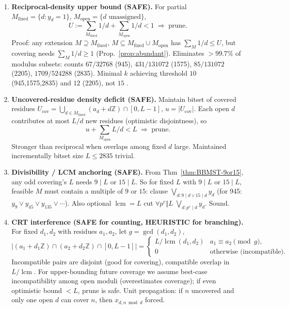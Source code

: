 \documentclass[11pt,a4paper]{article}
\theoremstyle{plain}
\theoremstyle{definition}
\theoremstyle{remark}
\newcommand{\Z}{\mathbb{Z}}
\begin{document}
\begin{enumerate}[label=\textbf{\arabic*.}]
\item \textbf{Reciprocal-density upper bound (SAFE).} For partial $M_{\mathrm{fixed}}=\{d:y_{d}=1\}$, $M_{\mathrm{open}}=\{d\text{ unassigned}\}$,
\[
U:=\sum_{M_{\mathrm{fixed}}}\!1/d+\sum_{M_{\mathrm{open}}}\!1/d<1\;\Rightarrow\;\text{prune}.
\]
Proof: any extension $M\supseteq M_{\mathrm{fixed}}$, $M\subseteq M_{\mathrm{fixed}}\cup M_{\mathrm{open}}$ has $\sum_{M}1/d\le U$, but covering needs $\sum_{M}1/d\ge1$ (Prop.~\ref{prop:abundant}). Eliminates $>99.7\%$ of modulus subsets: counts $67/32768$ (945), $431/131072$ (1575), $85/131072$ (2205), $1709/524288$ (2835). Minimal $k$ achieving threshold $10$ (945,1575,2835) and $12$ (2205), not $15$ .

\item \textbf{Uncovered-residue density deficit (SAFE).} Maintain bitset of covered residues $U_{\mathrm{cov}}=\bigcup_{d\in M_{\mathrm{fixed}}}(a_{d}+d\Z)\cap[0,L-1]$, $u=|U_{\mathrm{cov}}|$. Each open $d$ contributes at most $L/d$ new residues (optimistic disjointness), so
\[
u+\sum_{M_{\mathrm{open}}}L/d<L\;\Rightarrow\;\text{prune}.
\]
Stronger than reciprocal when overlaps among fixed $d$ large. Maintained incrementally bitset size $L\le2835$ trivial.

\item \textbf{Divisibility / LCM anchoring (SAFE).} From Thm~\ref{thm:BBMST-9or15}, any odd covering's $L$ needs $9\mid L$ or $15\mid L$. So for fixed $L$ with $9\mid L$ or $15\mid L$, feasible $M$ must contain a multiple of $9$ or $15$: clause $\bigvee_{d:9\mid d\lor15\mid d}y_{d}$ (for 945: $y_{9}\lor y_{45}\lor y_{135}\lor\cdots$). Also optional $\operatorname{lcm}=L$ cut $\forall p^{e}\Vert L\;\bigvee_{d:p^{e}\mid d}y_{d}$. Sound.

\item \textbf{CRT interference (SAFE for counting, HEURISTIC for branching).} For fixed $d_{1},d_{2}$ with residues $a_{1},a_{2}$, let $g=\gcd(d_{1},d_{2})$,
\[
|(a_{1}+d_{1}\Z)\cap(a_{2}+d_{2}\Z)\cap[0,L-1]|=
\begin{cases}
L/\operatorname{lcm}(d_{1},d_{2}) & a_{1}\equiv a_{2}\pmod g,\\
0 & \text{otherwise (incompatible).}
\end{cases}
\]
Incompatible pairs are disjoint (good for covering), compatible overlap in $L/\operatorname{lcm}$. For upper-bounding future coverage we assume best-case incompatibility among open moduli (overestimates coverage); if even optimistic bound $<L$, prune is safe. Unit propagation: if $n$ uncovered and only one open $d$ can cover $n$, then $x_{d,n\bmod d}$ forced.


\end{enumerate}
\end{document}
